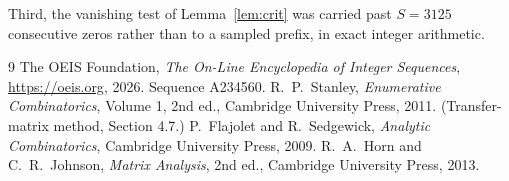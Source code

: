 \documentclass[11pt,a4paper]{article}
\theoremstyle{plain}
\theoremstyle{definition}
\begin{document}
Third, the vanishing test of Lemma~\ref{lem:crit} was carried past $S=3125$ consecutive
zeros rather than to a sampled prefix, in exact integer arithmetic.

\begin{thebibliography}{9}
 The OEIS Foundation, \emph{The On-Line Encyclopedia of Integer
Sequences}, \url{https://oeis.org}, 2026. Sequence A234560.
 R.~P.~Stanley, \emph{Enumerative Combinatorics}, Volume 1, 2nd ed.,
Cambridge University Press, 2011. (Transfer-matrix method, Section 4.7.)
 P.~Flajolet and R.~Sedgewick, \emph{Analytic Combinatorics}, Cambridge
University Press, 2009.
 R.~A.~Horn and C.~R.~Johnson, \emph{Matrix Analysis}, 2nd ed., Cambridge
University Press, 2013.
\end{thebibliography}
\end{document}
